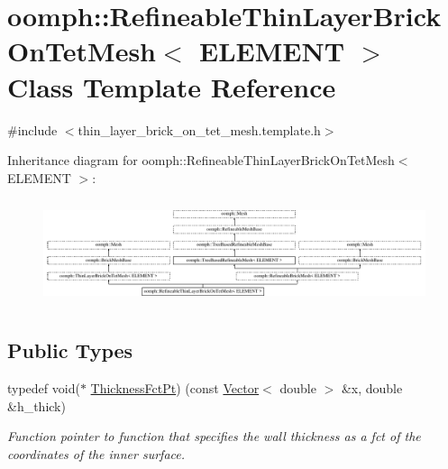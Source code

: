 \hypertarget{classoomph_1_1RefineableThinLayerBrickOnTetMesh}{}\section{oomph\+:\+:Refineable\+Thin\+Layer\+Brick\+On\+Tet\+Mesh$<$ E\+L\+E\+M\+E\+NT $>$ Class Template Reference}
\label{classoomph_1_1RefineableThinLayerBrickOnTetMesh}


{\ttfamily \#include $<$thin\+\_\+layer\+\_\+brick\+\_\+on\+\_\+tet\+\_\+mesh.\+template.\+h$>$}

Inheritance diagram for oomph\+:\+:Refineable\+Thin\+Layer\+Brick\+On\+Tet\+Mesh$<$ E\+L\+E\+M\+E\+NT $>$\+:\begin{figure}[H]
\begin{center}
\leavevmode
\includegraphics[height=3.146067cm]{classoomph_1_1RefineableThinLayerBrickOnTetMesh}
\end{center}
\end{figure}
\subsection*{Public Types}
\begin{DoxyCompactItemize}
\item 
typedef void($\ast$ \hyperlink{classoomph_1_1RefineableThinLayerBrickOnTetMesh_a744583cb70486874441d5a748f23168d}{Thickness\+Fct\+Pt}) (const \hyperlink{classoomph_1_1Vector}{Vector}$<$ double $>$ \&x, double \&h\+\_\+thick)
\begin{DoxyCompactList}\small\item\em Function pointer to function that specifies the wall thickness as a fct of the coordinates of the inner surface. \end{DoxyCompactList}\end{DoxyCompactItemize}
